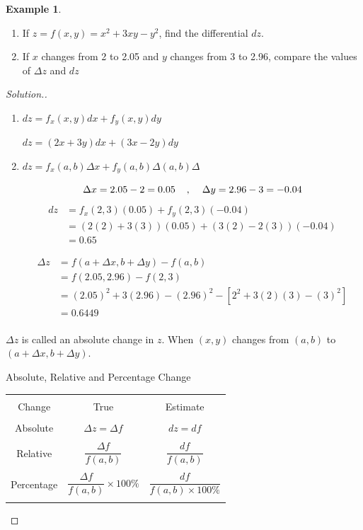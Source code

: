 \documentclass[11pt,a4paper]{article}
\theoremstyle{definition}
\newtheorem{exa}[thm]{Example}
\newenvironment{solution}
  {\renewcommand{\qedsymbol}{}\begin{proof}[\textit{Solution}.]}
  {\end{proof}}
\begin{document}
\begin{exa}
\begin{enumerate}
\item If $z = f(x,y) = x^2 + 3xy - y^2$, find the differential $dz$.
\item If $x$ changes from 2 to 2.05 and $y$ changes from 3 to 2.96, compare the values of $\Delta z$ and $dz$
\end{enumerate}
\end{exa}

\begin{solution}
\begin{enumerate}
\item $ dz  = f_x(x,y) dx + f_y (x,y) dy$

$dz = (2x + 3y)dx + (3x -2y)dy$

\item $ dz = f_x(a,b)\Delta x + f_y(a,b) \Delta (a,b) \Delta$

$$\Delta x = 2.05 - 2= 0.05\hspace{0.4cm} , \hspace{0.4cm} \Delta y = 2.96 - 3 = -0.04$$
\begin{align*}
dz & = f_x(2,3)(0.05) + f_y(2,3) (-0.04)\\
& = (2(2) + 3(3))(0.05)  + (3(2) - 2(3))(-0.04)\\
& = 0.65
\end{align*}

\begin{align*}
\Delta z & = f(a+ \Delta x, b + \Delta y) - f(a,b)\\
& = f(2.05,2.96) - f(2,3)\\
& = (2.05)^2 + 3(2.96) - (2.96)^2 - [2^2 + 3(2)(3)-(3)^2]\\
& = 0.6449\\
\end{align*}
\end{enumerate}

$\Delta z$ is called an absolute change in $z$. When $(x,y)$ changes from $(a,b)$ to $( a + \Delta x, b + \Delta y)$.

\begin{table}[H]
\centering
Absolute, Relative and Percentage Change


\begin{tabular}{ccc}
\hline
&&\\
Change & True & Estimate\\
\hline
&&\\
Absolute & $\displaystyle{\Delta z = \Delta f}$ & $dz = df$\\
&&\\
Relative & $\displaystyle{\dfrac{\Delta f}{f(a,b)}}$ & $\dfrac{df}{f(a,b)}$\\
&&\\
Percentage & $\displaystyle{\dfrac{\Delta f}{f(a,b)}\times 100\%}$ & $\dfrac{df}{f(a,b)\times 100\%}$\\
&&\\
\hline
\end{tabular}
\end{table}
\end{solution}
\end{document}
